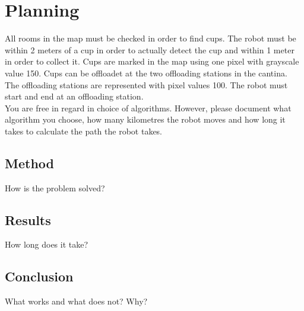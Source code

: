 \section{Planning}
\label{sec::planning}
All rooms in the map must be checked in order to find cups. The robot must be within 2 meters of a cup in order to actually detect the cup and within 1 meter in order to collect it. Cups are marked in the map using one pixel with grayscale value 150. Cups can be offloadet at the two offloading stations in the cantina. The offloading stations are represented with pixel values 100. The robot must start and end at an offloading station.\\[0.2cm]
You are free in regard in choice of algorithms. However, please document what algorithm you choose, how many kilometres the robot moves and how long it takes to calculate the path the robot takes.

\subsection{Method}
How is the problem solved? 

\subsection{Results}
How long does it take?

\subsection{Conclusion}
What works and what does not? Why?
